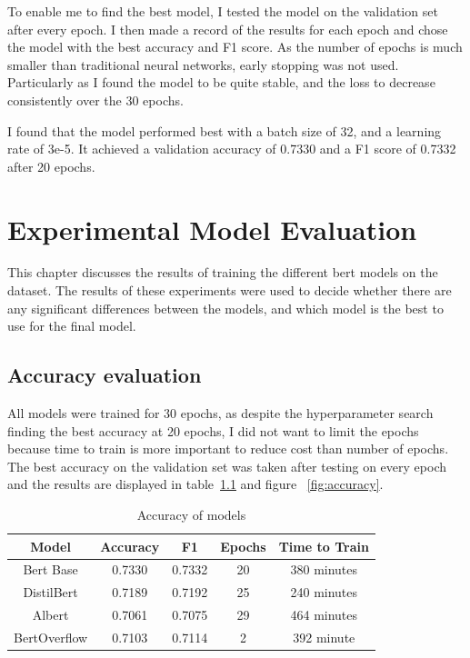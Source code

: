 \documentclass{UoYCSproject}
\begin{document}
    To enable me to find the best model, I tested the model on the validation set after every epoch.
    I then made a record of the results for each epoch and chose the model with the best accuracy and F1 score.
    As the number of epochs is much smaller than traditional neural networks, early stopping was not used.
    Particularly as I found the model to be quite stable, and the loss to decrease consistently over the 30 epochs.

    I found that the model performed best with a batch size of 32, and a learning rate of 3e-5.
    It achieved a validation accuracy of 0.7330 and a F1 score of 0.7332 after 20 epochs.

    \chapter{Experimental Model Evaluation}
    \label{ch:experimental-model-evaluation}
    This chapter discusses the results of training the different bert models on the dataset.
    The results of these experiments were used to decide whether there are any significant differences between the models, and which model is the best to use for the final model.

    \section{Accuracy evaluation}\label{sec:accuracy-evaluation}
    All models were trained for 30 epochs, as despite the hyperparameter search finding the best accuracy at 20 epochs, I did not want to limit the epochs because time to train is more important to reduce cost than number of epochs.
    The best accuracy on the validation set was taken after testing on every epoch and the results are displayed in table~\ref{tab:accuracy} and figure ~\ref{fig:accuracy}. \par



\begin{table}[h]
\centering
\begin{tabular}{ccccc}
\toprule
Model        & Accuracy & F1     & Epochs  & Time to Train\\
\midrule
Bert Base    & 0.7330   & 0.7332 & 20 & 380 minutes     \\\addlinespace[0.5em]
DistilBert   & 0.7189   & 0.7192 & 25 & 240 minutes     \\\addlinespace[0.5em]
Albert       & 0.7061   & 0.7075 & 29 & 464 minutes    \\\addlinespace[0.5em]
BertOverflow & 0.7103   & 0.7114 & 2 & 392 minute      \\
\bottomrule
\end{tabular}

\caption{Accuracy of models} \label{tab:accuracy}
\end{table}
\end{document}
